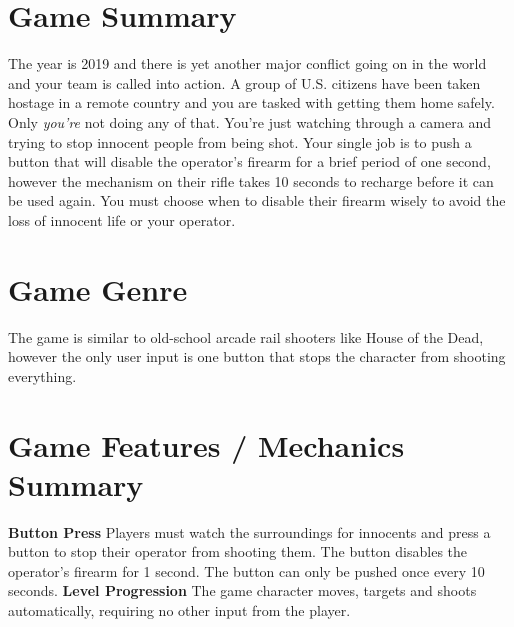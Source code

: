 \documentclass[11pt,fleqn]{book} %
\begin{document}
\section{Game Summary}

\quad The year is 2019 and there is yet another major conflict going on in the world and your team is called into action. A group of U.S. citizens have been taken hostage in a remote country and you are tasked with getting them home safely. Only \textit{you're} not doing any of that. You're just watching through a camera and trying to stop innocent people from being shot. Your single job is to push a button that will disable the operator's firearm for a brief period of one second, however the mechanism on their rifle takes 10 seconds to recharge before it can be used again. You must choose when to disable their firearm wisely to avoid the loss of innocent life or your operator.
\vspace{-\baselineskip}

\section{Game Genre}

The game is similar to old-school arcade rail shooters like House of the Dead, however the only user input is one button that stops the character from shooting everything.
\vspace{-\baselineskip}

\section{Game Features / Mechanics Summary}

\begin{outline}
	\1 \textbf{Button Press}
		\2 Players must watch the surroundings for innocents and press a button to stop their operator from shooting them.
		\2 The button disables the operator's firearm for 1 second.
		\2 The button can only be pushed once every 10 seconds.
	\1 \textbf{Level Progression}
		\2 The game character moves, targets and shoots automatically, requiring no other input from the player.
\end{outline}
\vspace{-\baselineskip}

\end{document}
